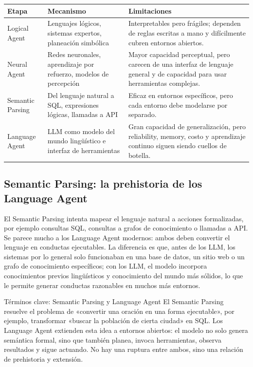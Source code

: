 \noindent\begin{tabularx}{\textwidth}{p{}p{}X}
\toprule
Etapa & Mecanismo & Limitaciones \\
\midrule
Logical Agent & Lenguajes lógicos, sistemas expertos, planeación simbólica & Interpretables pero frágiles; dependen de reglas escritas a mano y difícilmente cubren entornos abiertos. \\
Neural Agent & Redes neuronales, aprendizaje por refuerzo, modelos de percepción & Mayor capacidad perceptual, pero carecen de una interfaz de lenguaje general y de capacidad para usar herramientas complejas. \\
Semantic Parsing & Del lenguaje natural a SQL, expresiones lógicas, llamadas a API & Eficaz en entornos específicos, pero cada entorno debe modelarse por separado. \\
Language Agent & LLM como modelo del mundo lingüístico e interfaz de herramientas & Gran capacidad de generalización, pero reliability, memory, costo y aprendizaje continuo siguen siendo cuellos de botella. \\
\bottomrule
\end{tabularx}

\subsection{Semantic Parsing: la prehistoria de los Language Agent}

El Semantic Parsing intenta mapear el lenguaje natural a acciones formalizadas, por ejemplo consultas SQL, consultas a grafos de conocimiento o llamadas a API. Se parece mucho a los Language Agent modernos: ambos deben convertir el lenguaje en conductas ejecutables. La diferencia es que, antes de los LLM, los sistemas por lo general solo funcionaban en una base de datos, un sitio web o un grafo de conocimiento específicos; con los LLM, el modelo incorpora conocimientos previos lingüísticos y conocimiento del mundo más sólidos, lo que le permite generar conductas razonables en muchos más entornos.

\begin{knowledgebox}{Términos clave: Semantic Parsing y Language Agent}
El Semantic Parsing resuelve el problema de «convertir una oración en una forma ejecutable», por ejemplo, transformar «buscar la población de cierta ciudad» en SQL. Los Language Agent extienden esta idea a entornos abiertos: el modelo no solo genera semántica formal, sino que también planea, invoca herramientas, observa resultados y sigue actuando. No hay una ruptura entre ambos, sino una relación de prehistoria y extensión.
\end{knowledgebox}

